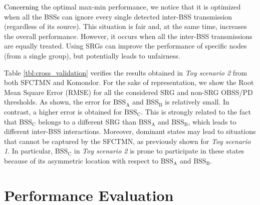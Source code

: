 \documentclass{ieeeaccess}
\begin{document}
\textcolor{black}{Concerning} the optimal max-min performance, we notice that it is optimized when all the BSSs can ignore every single detected inter-BSS transmission (regardless of its source). This situation is fair and, at the same time, increases the overall performance. However, it occurs when all the inter-BSS transmissions are equally treated. Using SRGs can improve the performance of specific nodes (from a single group), but potentially leads to unfairness. 

Table \ref{tbl:cross_validation} verifies the results obtained in \emph{Toy scenario 2} from both SFCTMN and Komondor. For the sake of representation, we show the Root Mean Square Error (RMSE) for all the considered SRG and non-SRG OBSS/PD thresholds. As shown, the error for $\text{BSS}_\text{A}$ and $\text{BSS}_\text{B}$ is relatively small. In contrast, a higher error is obtained for $\text{BSS}_\text{C}$. This is strongly related to the fact that $\text{BSS}_\text{C}$ belongs to a different SRG than $\text{BSS}_\text{A}$ and $\text{BSS}_\text{B}$, which leads to different inter-BSS interactions. Moreover, dominant states may lead to situations that cannot be captured by the SFCTMN, as previously shown for \emph{Toy scenario 1}. In particular, $\text{BSS}_\text{C}$ in \emph{Toy scenario 2} is prone to participate in these states because of its asymmetric location with respect to $\text{BSS}_\text{A}$ and $\text{BSS}_\text{B}$.
\begin{table}[ht!]
	\centering
	\caption{Verification of the results obtained in \emph{Toy scenario 2} from the SFCTMN and Komondor.}
	\label{tbl:cross_validation}
\end{table}


\section{Performance Evaluation}
\label{section:performance_evaluation}
\end{document}
